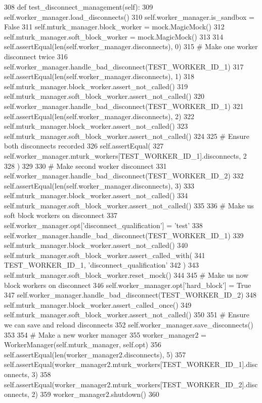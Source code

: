\begin{DoxyCode}
308     \textcolor{keyword}{def }test\_disconnect\_management(self):
309         self.worker\_manager.load\_disconnects()
310         self.worker\_manager.is\_sandbox = \textcolor{keyword}{False}
311         self.mturk\_manager.block\_worker = mock.MagicMock()
312         self.mturk\_manager.soft\_block\_worker = mock.MagicMock()
313 
314         self.assertEqual(len(self.worker\_manager.disconnects), 0)
315         \textcolor{comment}{# Make one worker disconnect twice}
316         self.worker\_manager.handle\_bad\_disconnect(TEST\_WORKER\_ID\_1)
317         self.assertEqual(len(self.worker\_manager.disconnects), 1)
318         self.mturk\_manager.block\_worker.assert\_not\_called()
319         self.mturk\_manager.soft\_block\_worker.assert\_not\_called()
320         self.worker\_manager.handle\_bad\_disconnect(TEST\_WORKER\_ID\_1)
321         self.assertEqual(len(self.worker\_manager.disconnects), 2)
322         self.mturk\_manager.block\_worker.assert\_not\_called()
323         self.mturk\_manager.soft\_block\_worker.assert\_not\_called()
324 
325         \textcolor{comment}{# Ensure both disconnects recorded}
326         self.assertEqual(
327             self.worker\_manager.mturk\_workers[TEST\_WORKER\_ID\_1].disconnects, 2
328         )
329 
330         \textcolor{comment}{# Make second worker disconnect}
331         self.worker\_manager.handle\_bad\_disconnect(TEST\_WORKER\_ID\_2)
332         self.assertEqual(len(self.worker\_manager.disconnects), 3)
333         self.mturk\_manager.block\_worker.assert\_not\_called()
334         self.mturk\_manager.soft\_block\_worker.assert\_not\_called()
335 
336         \textcolor{comment}{# Make us soft block workers on disconnect}
337         self.worker\_manager.opt[\textcolor{stringliteral}{'disconnect\_qualification'}] = \textcolor{stringliteral}{'test'}
338         self.worker\_manager.handle\_bad\_disconnect(TEST\_WORKER\_ID\_1)
339         self.mturk\_manager.block\_worker.assert\_not\_called()
340         self.mturk\_manager.soft\_block\_worker.assert\_called\_with(
341             TEST\_WORKER\_ID\_1, \textcolor{stringliteral}{'disconnect\_qualification'}
342         )
343         self.mturk\_manager.soft\_block\_worker.reset\_mock()
344 
345         \textcolor{comment}{# Make us now block workers on disconnect}
346         self.worker\_manager.opt[\textcolor{stringliteral}{'hard\_block'}] = \textcolor{keyword}{True}
347         self.worker\_manager.handle\_bad\_disconnect(TEST\_WORKER\_ID\_2)
348         self.mturk\_manager.block\_worker.assert\_called\_once()
349         self.mturk\_manager.soft\_block\_worker.assert\_not\_called()
350 
351         \textcolor{comment}{# Ensure we can save and reload disconnects}
352         self.worker\_manager.save\_disconnects()
353 
354         \textcolor{comment}{# Make a new worker manager}
355         worker\_manager2 = WorkerManager(self.mturk\_manager, self.opt)
356         self.assertEqual(len(worker\_manager2.disconnects), 5)
357         self.assertEqual(worker\_manager2.mturk\_workers[TEST\_WORKER\_ID\_1].disconnects, 3)
358         self.assertEqual(worker\_manager2.mturk\_workers[TEST\_WORKER\_ID\_2].disconnects, 2)
359         worker\_manager2.shutdown()
360 
\end{DoxyCode}
